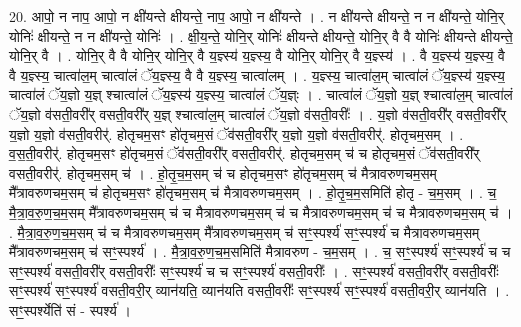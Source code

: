\documentclass[17pt]{extarticle}
\begin{document}
20. आपो॒ न नाप॒ आपो॒ न क्षी॑यन्ते क्षीयन्ते॒ नाप॒ आपो॒ न क्षी॑यन्ते । . न क्षी॑यन्ते क्षीयन्ते॒ न न क्षी॑यन्ते॒ योनि॒र् योनिः॑ क्षीयन्ते॒ न न क्षी॑यन्ते॒ योनिः॑ । . क्षी॒य॒न्ते॒ योनि॒र् योनिः॑ क्षीयन्ते क्षीयन्ते॒ योनि॒र् वै वै योनिः॑ क्षीयन्ते क्षीयन्ते॒ योनि॒र् वै । . योनि॒र् वै वै योनि॒र् योनि॒र् वै य॒ज्ञ्स्य॑ य॒ज्ञ्स्य॒ वै योनि॒र् योनि॒र् वै य॒ज्ञ्स्य॑ । . वै य॒ज्ञ्स्य॑ य॒ज्ञ्स्य॒ वै वै य॒ज्ञ्स्य॒ चात्वा॑ल॒म् चात्वा॑लं ॅय॒ज्ञ्स्य॒ वै वै य॒ज्ञ्स्य॒ चात्वा॑लम् । . य॒ज्ञ्स्य॒ चात्वा॑ल॒म् चात्वा॑लं ॅय॒ज्ञ्स्य॑ य॒ज्ञ्स्य॒ चात्वा॑लं ॅय॒ज्ञो य॒ज्ञ् श्चात्वा॑लं ॅय॒ज्ञ्स्य॑ य॒ज्ञ्स्य॒ चात्वा॑लं ॅय॒ज्ञ्ः । . चात्वा॑लं ॅय॒ज्ञो य॒ज्ञ् श्चात्वा॑ल॒म् चात्वा॑लं ॅय॒ज्ञो व॑सती॒वरी᳚र् वसती॒वरी᳚र् य॒ज्ञ् श्चात्वा॑ल॒म् चात्वा॑लं ॅय॒ज्ञो व॑सती॒वरीः᳚ । . य॒ज्ञो व॑सती॒वरी᳚र् वसती॒वरी᳚र् य॒ज्ञो य॒ज्ञो व॑सती॒वरीर्॑. होतृचम॒सꣳ हो॑तृचम॒सं ॅव॑सती॒वरी᳚र् य॒ज्ञो य॒ज्ञो व॑सती॒वरीर्॑. होतृचम॒सम् । . व॒स॒ती॒वरीर्॑. होतृचम॒सꣳ हो॑तृचम॒सं ॅव॑सती॒वरी᳚र् वसती॒वरीर्॑. होतृचम॒सम् च॑ च होतृचम॒सं ॅव॑सती॒वरी᳚र् वसती॒वरीर्॑. होतृचम॒सम् च॑ । . हो॒तृ॒च॒म॒सम् च॑ च होतृचम॒सꣳ हो॑तृचम॒सम् च॑ मैत्रावरुणचम॒सम् मै᳚त्रावरुणचम॒सम् च॑ होतृचम॒सꣳ हो॑तृचम॒सम् च॑ मैत्रावरुणचम॒सम् । . हो॒तृ॒च॒म॒समिति॑ होतृ - च॒म॒सम् । . च॒ मै॒त्रा॒व॒रु॒ण॒च॒म॒सम् मै᳚त्रावरुणचम॒सम् च॑ च मैत्रावरुणचम॒सम् च॑ च मैत्रावरुणचम॒सम् च॑ च मैत्रावरुणचम॒सम् च॑ । . मै॒त्रा॒व॒रु॒ण॒च॒म॒सम् च॑ च मैत्रावरुणचम॒सम् मै᳚त्रावरुणचम॒सम् च॑ सꣳ॒॒स्पर्श्य॑ सꣳ॒॒स्पर्श्य॑ च मैत्रावरुणचम॒सम् मै᳚त्रावरुणचम॒सम् च॑ सꣳ॒॒स्पर्श्य॑ । . मै॒त्रा॒व॒रु॒ण॒च॒म॒समिति॑ मैत्रावरुण - च॒म॒सम् । . च॒ सꣳ॒॒स्पर्श्य॑ सꣳ॒॒स्पर्श्य॑ च च सꣳ॒॒स्पर्श्य॑ वसती॒वरी᳚र् वसती॒वरीः᳚ सꣳ॒॒स्पर्श्य॑ च च सꣳ॒॒स्पर्श्य॑ वसती॒वरीः᳚ । . सꣳ॒॒स्पर्श्य॑ वसती॒वरी᳚र् वसती॒वरीः᳚ सꣳ॒॒स्पर्श्य॑ सꣳ॒॒स्पर्श्य॑ वसती॒वरी॒र् व्यान॑यति॒ व्यान॑यति वसती॒वरीः᳚ सꣳ॒॒स्पर्श्य॑ सꣳ॒॒स्पर्श्य॑ वसती॒वरी॒र् व्यान॑यति । . सꣳ॒॒स्पर्श्येति॑ सं - स्पर्श्य॑ । \newline
\end{document}
